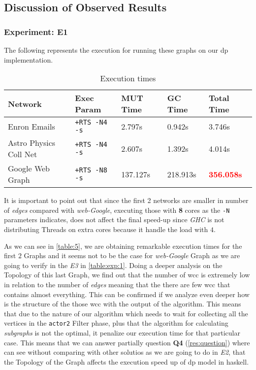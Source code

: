 \documentclass[preprint]{elsarticle}
\begin{document}
\subsection{\textbf{Discussion of Observed Results}}

\subsubsection{\textbf{Experiment: E1}}

The following represents the execution for running these graphs on our \acrshort{dp} implementation.

\begin{table}[H]
  \centering
  \begin{tabular}{|l|l|l|l|l|}
   \hline
   \textbf{Network} & \textbf{Exec Param} & \textbf{MUT Time} & \textbf{GC Time} & \textbf{Total Time}\\
   \hline
   Enron Emails & \texttt{+RTS -N4 -s} & 2.797s & 0.942s & 3.746s \\
   \hline
   Astro Physics Coll Net & \texttt{+RTS -N4 -s} & 2.607s & 1.392s & 4.014s \\
   \hline
   Google Web Graph & \texttt{+RTS -N8 -s} & 137.127s & 218.913s & \textbf{\textcolor{red}{356.058s}} \\
   \hline
  \end{tabular}
 \caption{Execution times}
 \label{table:5}
 \end{table}

It is important to point out that since the first 2 networks are smaller in number of \emph{edges} compared with \emph{web-Google}, executing those with \textbf{8} cores as the \texttt{-N} parameters indicates, does not affect the final speed-up since \emph{GHC} is not distributing Threads on extra cores because it handle the load with $4$.

As we can see in \autoref{table:5}, we are obtaining remarkable execution times for the first $2$ Graphs and it seems not to be the case for \textit{web-Google} Graph as we are going to verify in the \emph{E3} in \autoref{table:exp:1}.
Doing a deeper analysis on the Topology of this last Graph, we find out that the number of \acrshort{wcc} is extremely low in relation to the number of \emph{edges} meaning that the there are few \acrshort{wcc} that contains almost everything. This can be confirmed if we analyze even deeper how is the structure of the those \acrshort{wcc} with the output of the algorithm. This means that due to the nature of our algorithm which needs to wait for collecting all the vertices in the \texttt{actor2} Filter phase, plus that the algorithm for calculating \emph{subgraphs} is not the  optimal, it penalize our execution time for that particular case. This means that we can answer partially question \textbf{Q4} (\autoref{res:question}) where can see without comparing with other solutios as we are going to do in \emph{E2}, that the Topology of the Graph affects the execution speed up of \acrshort{dp} model in \acrshort{haskell}.
\end{document}
